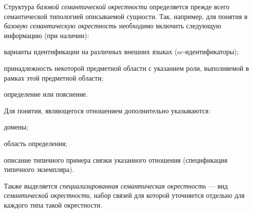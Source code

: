 \bigskip
Структура \textit{базовой семантической окрестности} определяется прежде всего семантической типологией описываемой сущности. Так, например, для понятия в \textit{базовую семантическую окрестность} необходимо включить следующую  информацию (при наличии):
\begin{textitemize}
	\item {варианты идентификации на различных внешних языках (sc-идентификаторы)};
	\item {принадлежность некоторой предметной области с указанием роли, выполняемой в рамках этой предметной области};
	\item{определение или пояснение}.	
\end{textitemize}

Для понятия, являющегося отношением дополнительно указываются:
\begin{textitemize}	
	\item {домены};
	\item {область определения};
	\item {описание типичного примера связки указанного отношения (спецификация типичного экземпляра)}.
\end{textitemize}

Также выделяется \textit{специализированная семантическая окрестность} --- вид \textit{семантической окрестности}, набор связей для которой уточняется отдельно для каждого типа такой окрестности.

